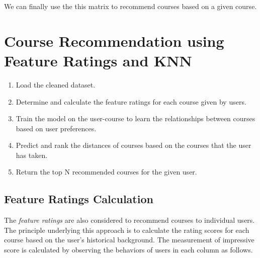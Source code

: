 \noindent We can finally use the this matrix to recommend courses based on a given course.

\section{Course Recommendation using Feature Ratings and KNN}
\begin{enumerate}
    \item \textsf{Load the cleaned dataset.}
    \item \textsf{Determine and calculate the feature ratings for each 
    course given by users.}
    \item \textsf{Train the model on the user-course to learn the relationships 
    between courses based on user preferences.}
    \item \textsf{Predict and rank the distances of courses based on the courses 
    that the user has taken.}
    \item \textsf{Return the top N recommended courses for the given user.}
\end{enumerate}

\subsection{Feature Ratings Calculation}

The \textit{feature ratings} are also considered to recommend courses to individual users.
The principle underlying this approach is to calculate the rating scores for each course 
based on the user's historical background. The measurement of impressive score is calculated 
by observing the behaviors of users in each column as follows.

